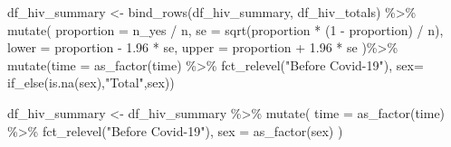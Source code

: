 \documentclass[
  letterpaper,
  DIV=11,
  numbers=noendperiod]{scrartcl}
\newenvironment{Shaded}{\begin{snugshade}}{\end{snugshade}}
\newcommand{\AttributeTok}[1]{\textcolor[rgb]{0.40,0.45,0.13}{#1}}
\newcommand{\DecValTok}[1]{\textcolor[rgb]{0.68,0.00,0.00}{#1}}
\newcommand{\FloatTok}[1]{\textcolor[rgb]{0.68,0.00,0.00}{#1}}
\newcommand{\FunctionTok}[1]{\textcolor[rgb]{0.28,0.35,0.67}{#1}}
\newcommand{\NormalTok}[1]{\textcolor[rgb]{0.00,0.23,0.31}{#1}}
\newcommand{\OtherTok}[1]{\textcolor[rgb]{0.00,0.23,0.31}{#1}}
\newcommand{\SpecialCharTok}[1]{\textcolor[rgb]{0.37,0.37,0.37}{#1}}
\newcommand{\StringTok}[1]{\textcolor[rgb]{0.13,0.47,0.30}{#1}}
\begin{document}
\begin{Shaded}
\begin{Highlighting}[]
\NormalTok{df\_hiv\_summary }\OtherTok{\textless{}{-}} \FunctionTok{bind\_rows}\NormalTok{(df\_hiv\_summary, df\_hiv\_totals) }\SpecialCharTok{\%\textgreater{}\%}
  \FunctionTok{mutate}\NormalTok{(}
    \AttributeTok{proportion =}\NormalTok{ n\_yes }\SpecialCharTok{/}\NormalTok{ n,}
    \AttributeTok{se =} \FunctionTok{sqrt}\NormalTok{(proportion }\SpecialCharTok{*}\NormalTok{ (}\DecValTok{1} \SpecialCharTok{{-}}\NormalTok{ proportion) }\SpecialCharTok{/}\NormalTok{ n),}
    \AttributeTok{lower =}\NormalTok{ proportion }\SpecialCharTok{{-}} \FloatTok{1.96} \SpecialCharTok{*}\NormalTok{ se,}
    \AttributeTok{upper =}\NormalTok{ proportion }\SpecialCharTok{+} \FloatTok{1.96} \SpecialCharTok{*}\NormalTok{ se}
\NormalTok{  )}\SpecialCharTok{\%\textgreater{}\%} 
  \FunctionTok{mutate}\NormalTok{(}\AttributeTok{time =} \FunctionTok{as\_factor}\NormalTok{(time) }\SpecialCharTok{\%\textgreater{}\%} 
           \FunctionTok{fct\_relevel}\NormalTok{(}\StringTok{"Before Covid{-}19"}\NormalTok{),}
         \AttributeTok{sex=} \FunctionTok{if\_else}\NormalTok{(}\FunctionTok{is.na}\NormalTok{(sex),}\StringTok{"Total"}\NormalTok{,sex))}



\NormalTok{df\_hiv\_summary }\OtherTok{\textless{}{-}}\NormalTok{  df\_hiv\_summary }\SpecialCharTok{\%\textgreater{}\%} 
  \FunctionTok{mutate}\NormalTok{(}
    \AttributeTok{time =} \FunctionTok{as\_factor}\NormalTok{(time) }\SpecialCharTok{\%\textgreater{}\%} 
      \FunctionTok{fct\_relevel}\NormalTok{(}\StringTok{"Before Covid{-}19"}\NormalTok{),}
    \AttributeTok{sex =} \FunctionTok{as\_factor}\NormalTok{(sex)}
\NormalTok{  )}
\end{Highlighting}
\end{Shaded}
\end{document}
